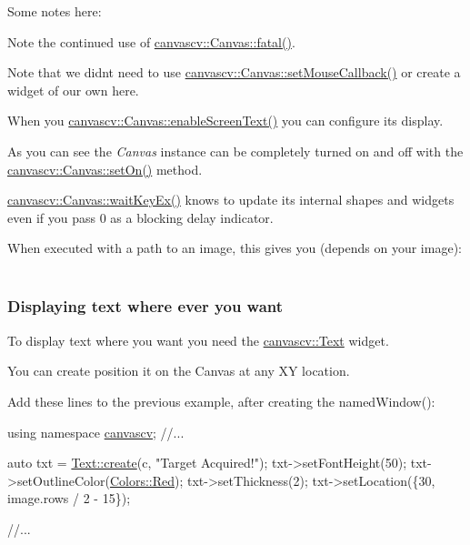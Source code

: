 Some notes here\+:
\begin{DoxyItemize}
\item Note the continued use of \hyperlink{classcanvascv_1_1Canvas_add93c0d5cc1e9b49f97510952a8a1961}{canvascv\+::\+Canvas\+::fatal()}.
\item Note that we didn\textquotesingle{}t need to use \hyperlink{classcanvascv_1_1Canvas_acf6e5d4b40aec610b0dc8c4f6bf93ac1}{canvascv\+::\+Canvas\+::set\+Mouse\+Callback()} or create a widget of our own here.
\item When you \hyperlink{classcanvascv_1_1Canvas_ae68d3277e738d349232400b38f0e5f9e}{canvascv\+::\+Canvas\+::enable\+Screen\+Text()} you can configure it\textquotesingle{}s display.
\item As you can see the {\itshape Canvas} instance can be completely turned on and off with the \hyperlink{classcanvascv_1_1Canvas_aba149ea25c6cdad2673133a060355954}{canvascv\+::\+Canvas\+::set\+On()} method.
\item \hyperlink{classcanvascv_1_1Canvas_a59397db05f5d9e45264f626f6a2ae528}{canvascv\+::\+Canvas\+::wait\+Key\+Ex()} knows to update it\textquotesingle{}s internal shapes and widgets even if you pass 0 as a blocking delay indicator.
\item When executed with a path to an image, this gives you (depends on your image)\+:  ~\newline

\end{DoxyItemize}\hypertarget{tutscreentext_screentext_s2_3}{}\subsubsection{Displaying text where ever you want}\label{tutscreentext_screentext_s2_3}
To display text where you want you need the \hyperlink{classcanvascv_1_1Text}{canvascv\+::\+Text} widget.

You can create position it on the Canvas at any XY location.

Add these lines to the previous example, after creating the named\+Window()\+: 
\begin{DoxyCode}
\textcolor{keyword}{using namespace }\hyperlink{namespacecanvascv}{canvascv};
    \textcolor{comment}{//...}

    \textcolor{keyword}{auto} txt = \hyperlink{classcanvascv_1_1Text_a7f3552263b6f185f78d90549e7ac38f7}{Text::create}(c, \textcolor{stringliteral}{"Target Acquired!"});
    txt->setFontHeight(50);
    txt->setOutlineColor(\hyperlink{classcanvascv_1_1Colors_a10aff24c53edf45b038d0636b061f9c2}{Colors::Red});
    txt->setThickness(2);
    txt->setLocation(\{30, image.rows / 2 - 15\});

    \textcolor{comment}{//...}
\end{DoxyCode}



